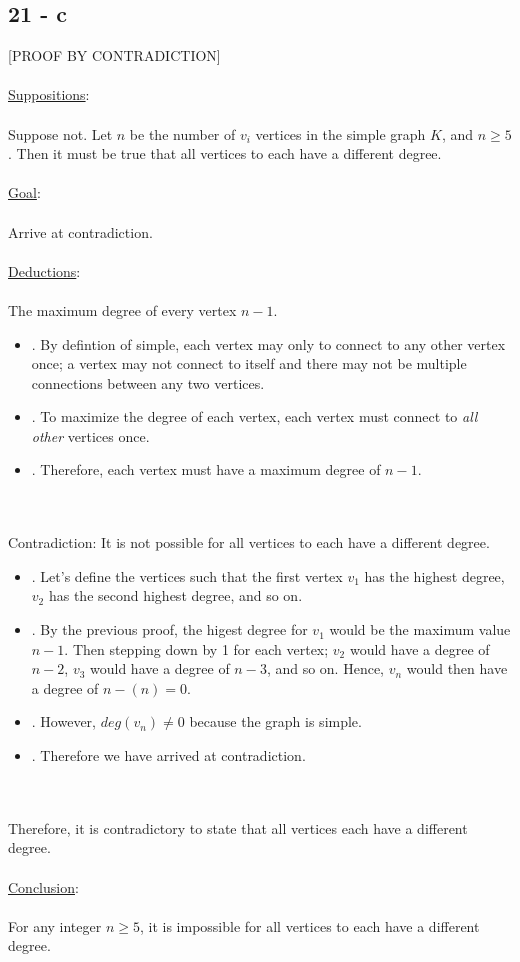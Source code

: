 \documentclass[12pt]{article}
\newcommand{\xlist}[1]{
    \begin{itemize}
        \renewcommand{\labelitemi}{$\centerdot$}
        #1
    \end{itemize}
    \newblock
}
\newcommand{\xsupposition}{
    \underline{Suppositions}:
    \\ \\
}
\newcommand{\xgoal}{
    \underline{Goal}:
    \\ \\
}
\newcommand{\xdeduction}{
    \underline{Deductions}:
    \\ \\
}
\newcommand{\xconclusion}{
    \underline{Conclusion}:
    \\ \\
}
\begin{document}
\subsection*{21 - c}
[PROOF BY CONTRADICTION]
\\ \\
\xsupposition
Suppose not. Let $n$ be the number of $v_i$ vertices in the simple graph $K$, and $n \geq 5$.
Then it must be true that all vertices to each have a different degree.
\\ \\
\xgoal
Arrive at contradiction.
\\ \\
\xdeduction
The maximum degree of every vertex $n-1$.
\xlist{
  \item [.] By defintion of simple, each vertex may only to connect to any other vertex once; 
  a vertex may not connect to itself and there may not be multiple connections between any two vertices.
  \item [.] To maximize the degree of each vertex, each vertex must connect to \textit{all other} vertices once.
  \item [.] Therefore, each vertex must have a maximum degree of $n-1$. 
}
\\ \\
Contradiction: It is not possible for all vertices to each have a different degree.
\xlist{
  \item [.] Let's define the vertices such that the first vertex $v_1$ has the highest degree, $v_2$ has the second highest degree, and so on. 
  \item [.] By the previous proof, the higest degree for $v_1$ would be the maximum value $n-1$. Then stepping down by 1 for each vertex; $v_2$ would have a degree of $n-2$, $v_3$ would have a degree of $n-3$, and so on.
  Hence, $v_n$ would then have a degree of $n - (n) = 0$.
  \item [.] However, $deg(v_n) \neq 0$ because the graph is simple.
  \item [.] Therefore we have arrived at contradiction.
}
\\ \\
Therefore, it is contradictory to state that all vertices each have a different degree.
\\ \\
\xconclusion
For any integer $n \geq 5$, it is impossible for all vertices to each have a different degree.
\end{document}
